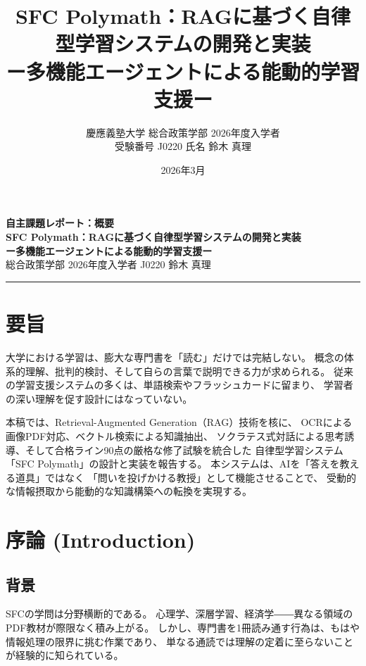 \documentclass[uplatex, dvipdfmx, a4paper, 11pt]{jsarticle}
\title{SFC Polymath：RAGに基づく自律型学習システムの開発と実装\\
\large ー多機能エージェントによる能動的学習支援ー}
\author{慶應義塾大学 総合政策学部 2026年度入学者\\ 受験番号 J0220 \quad 氏名 鈴木 真理}
\date{2026年3月}
\begin{document}
\begin{center}
    {\Large \textbf{自主課題レポート：概要}} \\[5mm]
    {\large \textbf{SFC Polymath：RAGに基づく自律型学習システムの開発と実装}} \\[2mm]
    {\large \textbf{ー多機能エージェントによる能動的学習支援ー}} \\[5mm]
    {\large 総合政策学部 2026年度入学者 \quad J0220 \quad 鈴木 真理} \\[2mm]
    \rule{\textwidth}{0.4mm}
\end{center}

\thispagestyle{empty}

\section*{要旨}
大学における学習は、膨大な専門書を「読む」だけでは完結しない。
概念の体系的理解、批判的検討、そして自らの言葉で説明できる力が求められる。
従来の学習支援システムの多くは、単語検索やフラッシュカードに留まり、
学習者の深い理解を促す設計にはなっていない。

本稿では、Retrieval-Augmented Generation（RAG）技術を核に、
OCRによる画像PDF対応、ベクトル検索による知識抽出、
ソクラテス式対話による思考誘導、そして合格ライン90点の厳格な修了試験を統合した
自律型学習システム「SFC Polymath」の設計と実装を報告する。
本システムは、AIを「答えを教える道具」ではなく
「問いを投げかける教授」として機能させることで、
受動的な情報摂取から能動的な知識構築への転換を実現する。

\vfill
\clearpage

\setcounter{page}{1}

\section{序論 (Introduction)}

\subsection{背景}
SFCの学問は分野横断的である。
心理学、深層学習、経済学――異なる領域のPDF教材が際限なく積み上がる。
しかし、専門書を1冊読み通す行為は、もはや情報処理の限界に挑む作業であり、
単なる通読では理解の定着に至らないことが経験的に知られている。
\end{document}
